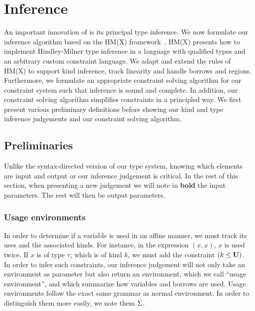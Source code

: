 \section{Inference}

An important innovation of \affe is its principal type inference.
We now formulate our inference algorithm
based on the HM(X) framework~\citep{DBLP:journals/tapos/OderskySW99}.
HM(X) presents how to implement Hindley-Milner type inference in a language
with qualified types and an arbitrary custom constraint language.
We adapt and extend the rules of HM(X) to support kind inference,
track linearity and handle borrows and regions. Furthermore, we
formulate an appropriate constraint solving algorithm for our constraint
system such that inference is sound and complete.
In addition, our constraint solving algorithm simplifies constraints in a
principled way.
We first present various preliminary definitions
before showing our kind and type inference judgements
and our constraint solving algorithm.

\subsection{Preliminaries}

Unlike the syntax-directed version of our type system, knowing which elements
are input and output or our inference judgement is critical. In the rest
of this section, when presenting a new judgement
we will note in \textbf{bold} the input parameters. The rest will then be
output parameters.

\subsubsection{Usage environments}


In order to determine if a variable is used in an affine manner, we must track
its uses and the associated kinds. For instance, in the expression
$(x,x)$, $x$ is used twice. If $x$ is of type $\tau$, which is of kind $k$,
we must add the constraint $(k \leq \mathbf{U})$.
%
In order to infer such constraints, our inference judgement will not only
take an environment as parameter but also return an environment, which
we call ``usage environment'', and which summarize how variables and borrows
are used. Usage environments follow the exact same grammar
as normal environment. In order to distinguish them more easily,
we note them $\Sigma$.


